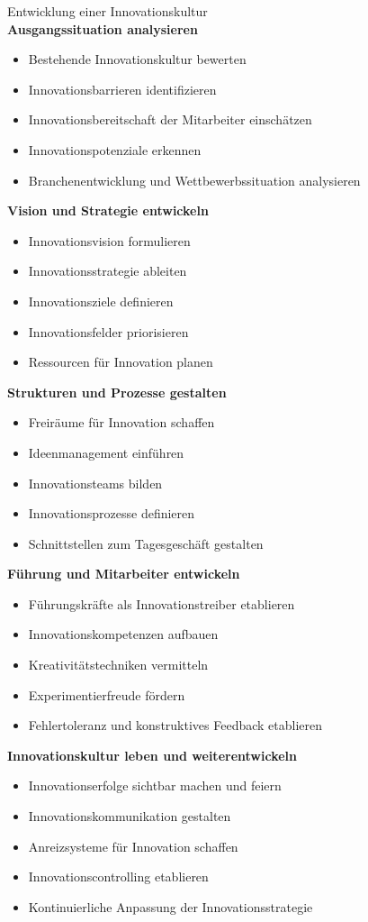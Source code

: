 \begin{KR}{Entwicklung einer Innovationskultur}\\
\textbf{Ausgangssituation analysieren}
\begin{itemize}
    \item Bestehende Innovationskultur bewerten
    \item Innovationsbarrieren identifizieren
    \item Innovationsbereitschaft der Mitarbeiter einschätzen
    \item Innovationspotenziale erkennen
    \item Branchenentwicklung und Wettbewerbssituation analysieren
\end{itemize}

\textbf{Vision und Strategie entwickeln}
\begin{itemize}
    \item Innovationsvision formulieren
    \item Innovationsstrategie ableiten
    \item Innovationsziele definieren
    \item Innovationsfelder priorisieren
    \item Ressourcen für Innovation planen
\end{itemize}

\textbf{Strukturen und Prozesse gestalten}
\begin{itemize}
    \item Freiräume für Innovation schaffen
    \item Ideenmanagement einführen
    \item Innovationsteams bilden
    \item Innovationsprozesse definieren
    \item Schnittstellen zum Tagesgeschäft gestalten
\end{itemize}

\textbf{Führung und Mitarbeiter entwickeln}
\begin{itemize}
    \item Führungskräfte als Innovationstreiber etablieren
    \item Innovationskompetenzen aufbauen
    \item Kreativitätstechniken vermitteln
    \item Experimentierfreude fördern
    \item Fehlertoleranz und konstruktives Feedback etablieren
\end{itemize}

\textbf{Innovationskultur leben und weiterentwickeln}
\begin{itemize}
    \item Innovationserfolge sichtbar machen und feiern
    \item Innovationskommunikation gestalten
    \item Anreizsysteme für Innovation schaffen
    \item Innovationscontrolling etablieren
    \item Kontinuierliche Anpassung der Innovationsstrategie
\end{itemize}
\end{KR}